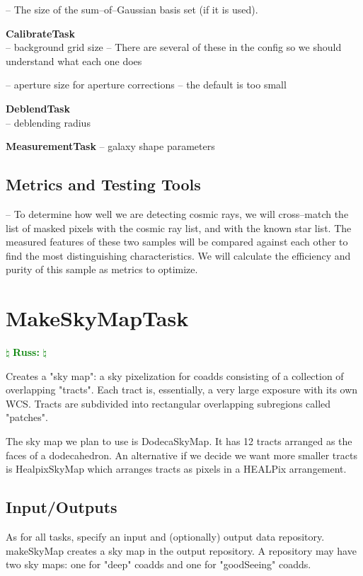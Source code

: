 \documentclass[12pt]{article}
\newcommand{\russ} { \textcolor{green} {
\ensuremath{\natural} {\bf Russ:}  
\ensuremath{\natural} } }
\begin{document}
-- The size of the sum--of--Gaussian basis set (if it is used).

{\bf CalibrateTask}\\
-- background grid size -- There are several of these in the config
  so we should understand what each one does

-- aperture size for aperture corrections -- the default is too small

{\bf DeblendTask}\\
-- deblending radius

{\bf MeasurementTask}
-- galaxy shape parameters

\subsection{Metrics and Testing Tools}

-- To determine how well we are detecting cosmic rays, we will
cross--match the list of masked pixels with the cosmic ray list, and
with the known star list.  The measured features of these two samples
will be compared against each other to find the most distinguishing
characteristics.  We will calculate the efficiency and purity of this
sample as metrics to optimize.


\clearpage 
\section{MakeSkyMapTask} \russ

Creates a "sky map": a sky pixelization for coadds consisting of a collection of overlapping "tracts".
Each tract is, essentially, a very large exposure with its own WCS.
Tracts are subdivided into rectangular overlapping subregions called "patches".

The sky map we plan to use is DodecaSkyMap. It has 12 tracts arranged as the faces of a dodecahedron.
An alternative if we decide we want more smaller tracts is HealpixSkyMap which arranges
tracts as pixels in a HEALPix arrangement.

\subsection{Input/Outputs}

As for all tasks, specify an input and (optionally) output data repository.
makeSkyMap creates a sky map in the output repository.
A repository may have two sky maps: one for "deep" coadds and one for "goodSeeing" coadds.
\end{document}
